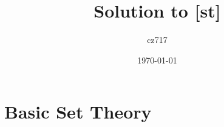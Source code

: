 \documentclass[a4paper]{report}
\begin{document}
  \title{Solution to [st]}
  \author{cz717}
  \date{\today}
  \maketitle


\part{Basic Set Theory}
  
\end{document}
